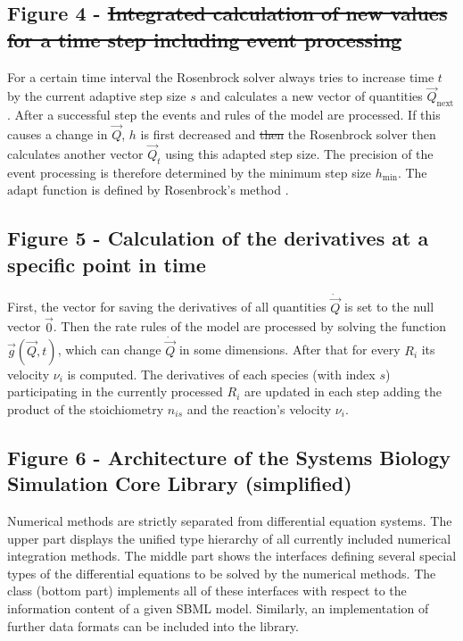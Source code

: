 \documentclass[10pt]{bmc_article}
\newenvironment{bmcformat}{\fussy\setboolean{publ}{true}}{\fussy}
\begin{document}
\begin{bmcformat}
\subsection*{Figure 4 - \sout{Integrated calculation of new values for a time step including event processing}}
For a certain time interval\COR{,} the Rosenbrock solver  always tries to increase time $t$ by the current adaptive
step size $s$ and calculates a new vector of quantities $\vec{Q}_{\mathrm{next}}$.
After a successful step\COR{,} the events and rules of the model are processed.
If this causes a change in $\vec{Q}$, $h$ is first decreased and \sout{then} the Rosenbrock solver then calculates another vector $\vec{Q}_{t}$ using this adapted step size.
The precision of the event processing is therefore determined by the minimum step size $h_{\min}$.
The $\mathrm{adapt}$ function is defined by Rosenbrock's method \cite{Press1993}.

\subsection*{Figure 5 - Calculation of the derivatives at a specific point in time}
First, the vector for saving the derivatives of all quantities $\dot{\vec{Q}}$ is set to the null vector $\vec{0}$.
Then the rate rules of the model are processed by solving the function $\vec{g}(\vec{Q}, t)$, which can change $\dot{\vec{Q}}$ in some dimensions.
After that for every  $R_i$ its velocity $\nu_i$ is computed.
The derivatives of each species (with index $s$) participating in the currently processed  $R_i$ are updated
in each step adding the product of the stoichiometry $n_{is}$ and the reaction's velocity $\nu_i$.

\subsection*{Figure 6 - Architecture of the Systems Biology Simulation Core Library (simplified)}
Numerical methods are strictly separated from differential equation systems. The
upper part displays the unified type hierarchy of all currently included numerical integration
methods. The middle part shows the interfaces defining several
special types of the differential equations to be solved by the numerical
methods.
The class \SBMLinterpreter (bottom part) implements all of these interfaces
with respect to the information content of a given \acs{SBML} model. Similarly, an
implementation of further data formats can be included into the
library.


\end{bmcformat}
\end{document}
